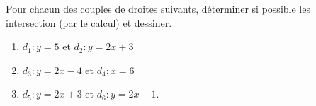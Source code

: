 
\begin{exercice}\label{exosmath-0609}

    Pour chacun des couples de droites suivants, déterminer si possible les intersection (par le calcul) et dessiner.
    \begin{enumerate}
        \item
            \( d_1:y=5\) et \( d_2:y=2x+3\)
        \item
            \( d_3:y=2x-4\) et \( d_4:x=6\)
        \item
            \( d_5:y=2x+3\) et \( d_6:y=2x-1\).
    \end{enumerate}

\end{exercice}

